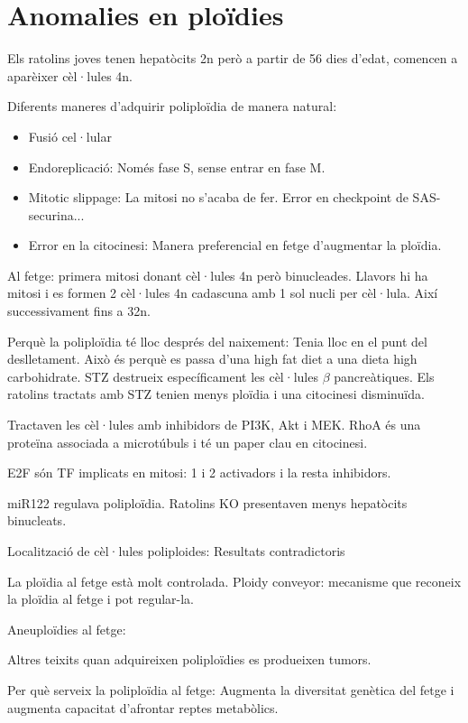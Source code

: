 
\section{Anomalies en ploïdies}
\label{sec:anom-en-ploid}

Els ratolins joves tenen hepatòcits 2n però a partir de 56 dies d'edat, comencen a aparèixer cèl·lules 4n.

Diferents maneres d'adquirir poliploïdia de manera natural:
\begin{itemize}
\item Fusió cel·lular
\item Endoreplicació: Només fase S, sense entrar en fase M.
\item Mitotic slippage: La mitosi no s'acaba de fer. Error en checkpoint de SAS-securina...
\item Error en la citocinesi: Manera preferencial en fetge d'augmentar la ploïdia.
\end{itemize}

Al fetge: primera mitosi donant cèl·lules 4n però binucleades. Llavors hi ha mitosi i es formen 2 cèl·lules 4n cadascuna amb 1 sol nucli per cèl·lula. Així successivament fins a 32n.

Perquè la poliploïdia té lloc després del naixement: Tenia lloc en el punt del deslletament. Això és perquè es passa d'una high fat diet a una dieta high carbohidrate. STZ destrueix específicament les cèl·lules $\beta$ pancreàtiques. Els ratolins tractats amb STZ tenien menys ploïdia i una citocinesi disminuïda.

Tractaven les cèl·lules amb inhibidors de PI3K, Akt i MEK. RhoA és una proteïna associada a microtúbuls i té un paper clau en citocinesi.


E2F són TF implicats en mitosi: 1 i 2 activadors i la resta inhibidors.

miR122 regulava poliploïdia. Ratolins KO presentaven menys hepatòcits binucleats.

Localització de cèl·lules poliploides: Resultats contradictoris

La ploïdia al fetge està molt controlada. Ploidy conveyor: mecanisme que reconeix la ploïdia al fetge i pot regular-la.

Aneuploïdies al fetge: 

Altres teixits quan adquireixen poliploïdies es produeixen tumors.

Per què serveix la poliploïdia al fetge: Augmenta la diversitat genètica del fetge i augmenta capacitat d'afrontar reptes metabòlics.